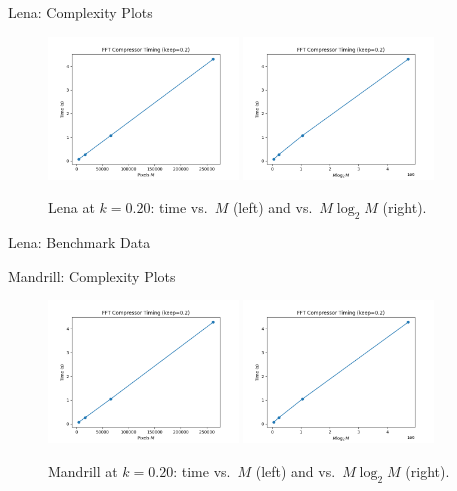 \documentclass[12pt]{beamer}
\begin{document}
\begin{frame}{Lena: Complexity Plots}
  \begin{figure}[t]
    \centering
    \includegraphics[width=0.45\textwidth]{time_vs_M_Lena.png}
    \hfill
    \includegraphics[width=0.45\textwidth]{time_vs_MlogM_Lena.png}
    \caption*{Lena at \(k=0.20\): time vs.\ \(M\) (left) and vs.\ \(M\log_2 M\) (right).}
  \end{figure}
\end{frame}

\begin{frame}{Lena: Benchmark Data}
  \small
  \normalsize
\end{frame}

\begin{frame}{Mandrill: Complexity Plots}
  \begin{figure}[t]
    \centering
    \includegraphics[width=0.45\textwidth]{time_vs_M_Mandrill.png}
    \hfill
    \includegraphics[width=0.45\textwidth]{time_vs_MlogM_Mandrill.png}
    \caption*{Mandrill at \(k=0.20\): time vs.\ \(M\) (left) and vs.\ \(M\log_2 M\) (right).}
  \end{figure}
\end{frame}
\end{document}
